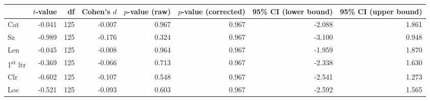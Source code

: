 \begin{tabular}{lrrrrrrr}
\toprule
 & $t$-value & df & Cohen's $d$ & $p$-value (raw) & $p$-value (corrected) & 95\% CI (lower bound) & 95\% CI (upper bound) \\
\midrule
 Cat & -0.041 & 125 & -0.007 & 0.967 & 0.967 & -2.088 & 1.861 \\
 Sz & -0.989 & 125 & -0.176 & 0.324 & 0.967 & -3.100 & 0.948 \\
 Len & -0.045 & 125 & -0.008 & 0.964 & 0.967 & -1.959 & 1.870 \\
 1\textsuperscript{st} ltr & -0.369 & 125 & -0.066 & 0.713 & 0.967 & -2.338 & 1.630 \\
 Clr & -0.602 & 125 & -0.107 & 0.548 & 0.967 & -2.541 & 1.273 \\
 Loc & -0.521 & 125 & -0.093 & 0.603 & 0.967 & -2.592 & 1.565 \\
\bottomrule
\end{tabular}
